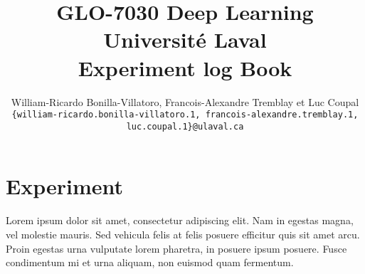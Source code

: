 \documentclass[10pt]{report} %
\title{
\textbf{GLO-7030 Deep Learning}\\
\vspace{1em}
Université Laval\\
\vspace{1em}
\huge Experiment log Book
\propositionVersion{1.0}
\vspace{2em}
}
\author{%
    \large
    William-Ricardo Bonilla-Villatoro,
    Francois-Alexandre Tremblay
    \textnormal{et} Luc Coupal \\
    {\footnotesize \texttt{\{william-ricardo.bonilla-villatoro.1, francois-alexandre.tremblay.1, luc.coupal.1\}@ulaval.ca}} \\
}
\begin{document}
    \maketitle
    \tableofcontents
    \newpage

    \section{Experiment}
    Lorem ipsum dolor sit amet, consectetur adipiscing elit. Nam in egestas magna, vel molestie mauris. Sed vehicula felis at felis posuere efficitur quis sit amet arcu. Proin egestas urna vulputate lorem pharetra, in posuere ipsum posuere. Fusce condimentum mi et urna aliquam, non euismod quam fermentum.
\end{document}
